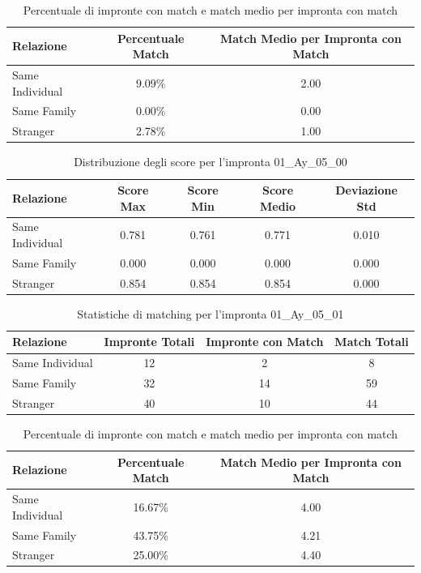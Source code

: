 \begin{table}[htbp]
\centering
\caption{Percentuale di impronte con match e match medio per impronta con match}
\label{tab:match_percentage_01_Ay_05_00}
\begin{tabular}{|l|c|c|}
\hline
\textbf{Relazione} & \textbf{Percentuale Match} & \textbf{Match Medio per Impronta con Match} \\
\hline
Same Individual & 9.09\% & 2.00 \\
\hline
Same Family & 0.00\% & 0.00 \\
\hline
Stranger & 2.78\% & 1.00 \\
\hline
\end{tabular}
\end{table}


\begin{table}[htbp]
\centering
\caption{Distribuzione degli score per l'impronta 01\_Ay\_05\_00}
\label{tab:scores_01_Ay_05_00}
\begin{tabular}{|l|c|c|c|c|}
\hline
\textbf{Relazione} & \textbf{Score Max} & \textbf{Score Min} & \textbf{Score Medio} & \textbf{Deviazione Std} \\
\hline
Same Individual & 0.781 & 0.761 & 0.771 & 0.010 \\
\hline
Same Family & 0.000 & 0.000 & 0.000 & 0.000 \\
\hline
Stranger & 0.854 & 0.854 & 0.854 & 0.000 \\
\hline
\end{tabular}
\end{table}


\begin{table}[htbp]
\centering
\caption{Statistiche di matching per l'impronta 01\_Ay\_05\_01}
\label{tab:results_01_Ay_05_01}
\begin{tabular}{|l|c|c|c|}
\hline
\textbf{Relazione} & \textbf{Impronte Totali} & \textbf{Impronte con Match} & \textbf{Match Totali} \\
\hline
Same Individual & 12 & 2 & 8 \\
\hline
Same Family & 32 & 14 & 59 \\
\hline
Stranger & 40 & 10 & 44 \\
\hline
\end{tabular}
\end{table}


\begin{table}[htbp]
\centering
\caption{Percentuale di impronte con match e match medio per impronta con match}
\label{tab:match_percentage_01_Ay_05_01}
\begin{tabular}{|l|c|c|}
\hline
\textbf{Relazione} & \textbf{Percentuale Match} & \textbf{Match Medio per Impronta con Match} \\
\hline
Same Individual & 16.67\% & 4.00 \\
\hline
Same Family & 43.75\% & 4.21 \\
\hline
Stranger & 25.00\% & 4.40 \\
\hline
\end{tabular}
\end{table}


